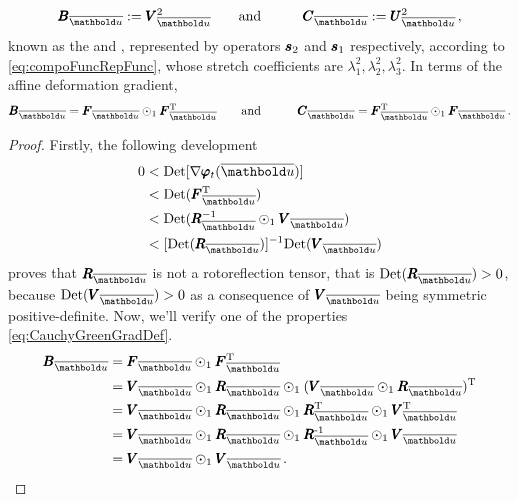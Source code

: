 \begin{alignat}{3} 
\tnr{B}_{\overline{\vto{u}}}:=\tnr{V}_{\overline{\vto{u}}}^2&\qquad \text{and}\qquad & \tnr{C}_{\overline{\vto{u}}}:=\tnr{U}_{\overline{\vto{u}}}^2\,,
\end{alignat}
known as the  and , represented by operators $\pmb{s}_2$ and $\pmb{s}_1$ respectively, according to \eqref{eq:compoFuncRepFunc}, whose stretch coefficients are $\lambda_1^2,\lambda_2^2,\lambda_3^2$. In terms of the affine deformation gradient,
\begin{alignat}{3}\label{eq:CauchyGreenGradDef}
\tnr{B}_{\overline{\vto{u}}}=\tnr{F}_{\overline{\vto{u}}}\odot_1\tnr{F}_{\overline{\vto{u}}}^\text{T}&\qquad \text{and}\qquad & \tnr{C}_{\overline{\vto{u}}}=\tnr{F}_{\overline{\vto{u}}}^\text{T}\odot_1\tnr{F}_{\overline{\vto{u}}}\,.
\end{alignat}


{\footnotesize
\begin{proof}
Firstly, the following development 
\begin{align*}
0&<\textnormal{Det}[\fua{\nabla\tnr{\varphi}_t}{\overline{\vto{u}}}]\\ 
&< \textnormal{Det}(\tnr{F}_{\overline{\vto{u}}}^\text{T})\\
&< \textnormal{Det}(\tnr{R}_{\overline{\vto{u}}}^{-1}\odot_1\tnr{V}_{\overline{\vto{u}}})\\
&< [\textnormal{Det}(\tnr{R}_{\overline{\vto{u}}})]^{-1}\textnormal{Det}(\tnr{V}_{\overline{\vto{u}}})
\end{align*}
proves that $\tnr{R}_{\overline{\vto{u}}}$ is not a rotoreflection tensor, that is $\textnormal{Det}(\tnr{R}_{\overline{\vto{u}}})>0$, because $\textnormal{Det}(\tnr{V}_{\overline{\vto{u}}})>0$ as a consequence of $\tnr{V}_{\overline{\vto{u}}}$ being symmetric positive-definite. Now, we'll verify one of the properties \eqref{eq:CauchyGreenGradDef}. 
\begin{align*}
\tnr{B}_{\overline{\vto{u}}}&=\tnr{F}_{\overline{\vto{u}}}\odot_1\tnr{F}_{\overline{\vto{u}}}^\text{T}\\
&=\tnr{V}_{\overline{\vto{u}}}\odot_1\tnr{R}_{\overline{\vto{u}}}\odot_1(\tnr{V}_{\overline{\vto{u}}}\odot_1\tnr{R}_{\overline{\vto{u}}})^\text{T}\\
&=\tnr{V}_{\overline{\vto{u}}}\odot_1\tnr{R}_{\overline{\vto{u}}}\odot_1\tnr{R}_{\overline{\vto{u}}}^\text{T}\odot_1\tnr{V}_{\overline{\vto{u}}}^\text{T}\\
&=\tnr{V}_{\overline{\vto{u}}}\odot_1\tnr{R}_{\overline{\vto{u}}}\odot_1\tnr{R}_{\overline{\vto{u}}}^\text{-1}\odot_1\tnr{V}_{\overline{\vto{u}}}\\
&=\tnr{V}_{\overline{\vto{u}}}\odot_1\tnr{V}_{\overline{\vto{u}}}\,.
\end{align*}
\end{proof}
}

